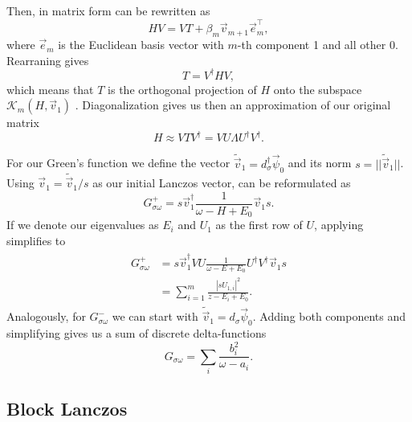 Then,  in matrix form can be rewritten as
\begin{equation}
    H V = V T + \beta_{m}\vec{v}_{m+1}\vec{e}_{m}^\intercal,
\end{equation}
where $\vec{e}_m$ is the Euclidean basis vector with $m$-th component 1 and all other 0.
Rearraning gives
\begin{equation}
    T = V^\dag H V,
\end{equation}
which means that $T$ is the orthogonal projection of $H$ onto
the subspace $\mathcal{K}_m(H, \vec{v}_1)$ \cite{Cullum1985}.
Diagonalization gives us then an approximation of our original matrix
\begin{equation}
    H \approx V T V^\dag = V U \Lambda U^\dag V^\dag.
    \label{eq:Lanczos-matrix-approximation}
\end{equation}

For our Green's function we define the vector $\tilde{\vec{v}}_1 = d_\sigma^\dag \vec{\psi}_0$
and its norm $s = ||\tilde{\vec{v}}_1||$.
Using $\vec{v}_1 = \tilde{\vec{v}}_1/s$ as our initial Lanczos vector,
 can be reformulated as
\begin{equation}
    G^+_{\sigma\omega} = s \vec{v}_1^\dag \frac{1}{\omega - H + E_0} \vec{v}_1 s.
\end{equation}
If we denote our eigenvalues as $E_i$ and $U_1$ as the first row of $U$,
applying  simplifies to
\begin{align}
    \begin{split}
        G^+_{\sigma\omega}
         & =
        s \vec{v}_1^\dag V U \frac{1}{\omega - E + E_0} U^\dag V^\dag \vec{v}_1 s \\
         & =
        \sum_{i=1}^m \frac{|s U_{1,i}|^2}{z - E_i + E_0}.
    \end{split}
\end{align}
Analogously, for $G^-_{\sigma\omega}$ we can start with $\tilde{\vec{v}}_1 = d_\sigma \vec{\psi}_0$.
Adding both components and simplifying gives us a sum of discrete delta-functions \cite{Lu2014}
\begin{equation}
    G_{\sigma\omega} = \sum_i \frac{b_i^2}{\omega - a_i}.
\end{equation}

\subsection{Block Lanczos}

